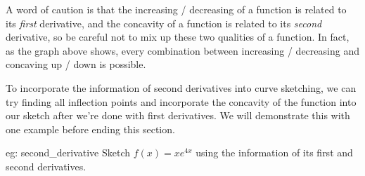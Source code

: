 A word of caution is that the increasing / decreasing of a function is related to its \textit{first} derivative, and the concavity of a function is related to its \textit{second} derivative, so be careful not to mix up these two qualities of a function.  In fact, as the graph above shows, every combination between increasing / decreasing and concaving up / down is possible.

To incorporate the information of second derivatives into curve sketching, we can try finding all inflection points and incorporate the concavity of the function into our sketch after we're done with first derivatives.  We will demonstrate this with one example before ending this section. 

\begin{eg}[]{eg: second_derivative}
    Sketch $f(x) = xe^{4x}$ using the information of its first and second derivatives.
\end{eg}

